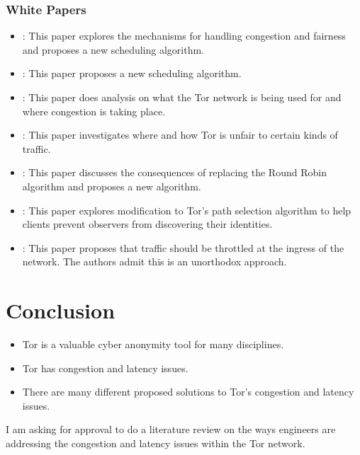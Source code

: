 \documentclass[letterpaper,13pt]{texMemo}
\begin{document}
\subsubsection*{White Papers}
\begin{itemize}
    \item
    \citeauthor*{unfair}: This paper explores the mechanisms for handling congestion
    and fairness and proposes a new scheduling algorithm.
    \item
    \citeauthor*{Tang}: This paper proposes a new scheduling algorithm.
    \item
    \citeauthor*{analysis}: This paper does analysis on what the Tor network is being used for and where congestion is taking place.
    \item
    \citeauthor*{delay}: This paper investigates where and how Tor is unfair to certain kinds of traffic.
    \item
    \citeauthor*{Bauer}: This paper discusses the consequences of replacing the Round Robin algorithm and
    proposes a new algorithm.
    \item
    \citeauthor*{Edman}: This paper explores modification to Tor's path selection algorithm to help
    clients prevent observers from discovering their identities.
    \item
    \citeauthor*{Moore}: This paper proposes that traffic should be throttled at the ingress of the
    network. The authors admit this is an unorthodox approach.

\end{itemize}


{\section*{Conclusion}}
\begin{itemize}
    \item
    Tor is a valuable cyber anonymity tool for many disciplines.
    \item
    Tor has congestion and latency issues.
    \item
    There are many different proposed solutions to Tor's congestion and latency issues.
\end{itemize}
I am asking for approval to do a literature review on the ways engineers are addressing the
congestion and latency issues within the Tor network.

\newpage

\center \renewcommand\refname{Work Cited\\ }

\end{document}
